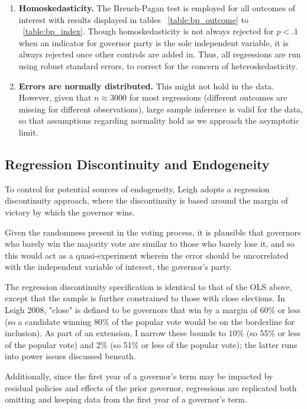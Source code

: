 \documentclass{article}
\begin{document}
\begin{enumerate}
\item \textbf{Homoskedasticity.} The Breuch-Pagan test is employed for all outcomes of interest with results displayed in tables ~\ref{table:bp_outcome} to ~\ref{table:bp_index}. Though homoskedasticity is not always rejected for $p < .1$ when an indicator for governor party is the sole independent variable, it is always rejected once other controls are added in. Thus, all regressions are run using robust standard errors, to correct  for the concern of heteroskedasticity.

\item \textbf{Errors are normally distributed.} This might not hold in the data. However, given that $n \approx 3000$ for most regressions (different outcomes are missing for different observations), large sample inference is valid for the data, so that assumptions regarding normality hold as we approach the asymptotic limit.
\end{enumerate}


\subsection{Regression Discontinuity and Endogeneity}

To control for potential sources of endogeneity, Leigh adopts a regression discontinuity approach, where the discontinuity is based around the margin of victory by which the governor wins.

Given the randomness present in the voting process, it is plausible that governors who barely win the majority vote are similar to those who barely lose it, and so this would act as a quasi-experiment wherein the error should be uncorrelated with the independent variable of interest, the governor's party. 

The regression discontinuity specification is identical to that of the OLS above, except that the sample is further constrained to those with close elections. In Leigh 2008, "close" is defined to be governors that win by a margin of 60\% or less (so a candidate winning 80\% of the popular vote would be on the borderline for inclusion). As part of an extension, I narrow these bounds to 10\% (so 55\% or less of the popular vote) and 2\% (so 51\% or less of the popular vote); the latter runs into power issues discussed beneath.

Additionally, since the first year of a governor's term may be impacted by residual policies and effects of the prior governor, regressions are replicated both omitting and keeping data from the first year of a governor's term.
\end{document}
